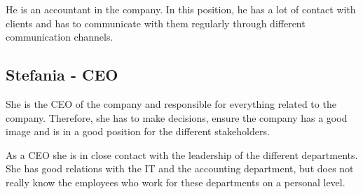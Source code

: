 He is an accountant in the company. 
In this position, he has a lot of contact with clients and has to communicate with them regularly through different communication channels. 

\subsection{Stefania - CEO}

She is the CEO of the company and responsible for everything related to the company. 
Therefore, she has to make decisions, ensure the company has a good image and is in a good position for the different stakeholders.

As a CEO she is in close contact with the leadership of the different departments.
She has good relations with the IT and the accounting department, but does not really know the employees who work for these departments on a personal level.